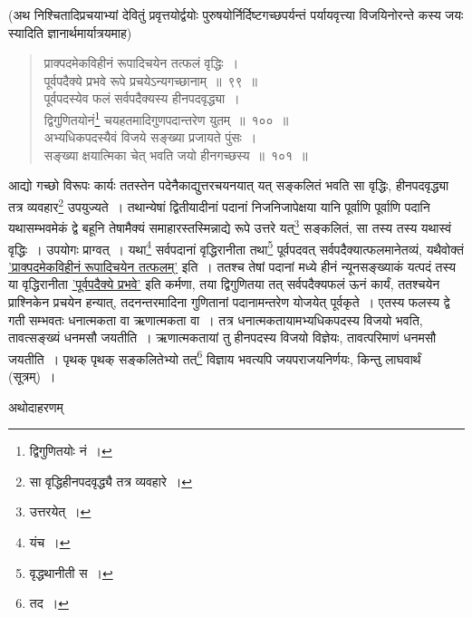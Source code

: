 \documentclass[10pt, openany]{book}
\begin{document}
{{{{{{{{{{{{{{\newpage

{(अथ निश्चितादिप्रचयाभ्यां देवितुं प्रवृत्तयोर्द्वयोः
पुरुषयोर्निर्दिष्टगच्छपर्यन्तं पर्यायवृत्त्या विजयिनोरन्ते कस्य जयः स्यादिति ज्ञानार्थमार्यात्रयमाह\textemdash)}

 \label{99}
\begin{quote}
    
{\bs प्राक्पदमेकविहीनं रूपादिचयेन तत्फलं वृद्धिः~।\\
 पूर्वपदैक्ये प्रभवे रूपे प्रचयेऽन्यगच्छानाम्~॥~९९~॥ \\
 पूर्वपदस्येव फलं सर्वपदैक्यस्य हीनपदवृद्ध्या~।\\
 द्विगुणितयोनं\renewcommand{\thefootnote}{१}\footnote{द्विगुणितयोः नं~।}  चयहतमादिगुणपदान्तरेण युतम्~॥~१००~॥ \\
 अभ्यधिकपदस्यैवं विजये सङ्ख्या प्रजायते पुंसः~।\\
 सङ्ख्या क्षयात्मिका चेत् भवति जयो हीनगच्छस्य~॥~१०१~॥}\end{quote}

{आद्यो गच्छो विरूपः कार्यः ततस्तेन पदेनैकाद्युत्तरचयनयात् यत् सङ्कलितं
भवति सा वृद्धिः,}
{हीनपदवृद्ध्या तत्र व्यवहार\renewcommand{\thefootnote}{२}\footnote{सा वृद्धिहीनपदवृद्ध्यै तत्र व्यवहारे~।}   उपयुज्यते~। तथान्येषां द्वितीयादीनां
पदानां निजनिजापेक्षया}
{यानि पूर्वाणि पूर्वाणि पदानि यथासम्भवमेकं द्वे बहूनि तेषामैक्यं
समाहारस्तस्मिन्नाद्ये रूपे}
{उत्तरे यत्\renewcommand{\thefootnote}{३}\footnote{उत्तरयेत्~।}   सङ्कलितं, सा तस्य तस्य यथास्वं वृद्धिः~। उपयोगः
प्राग्वत्~। यथा\renewcommand{\thefootnote}{४}\footnote{यंच~।}   सर्वपदानां}
{वृद्धिरानीता तथा\renewcommand{\thefootnote}{५}\footnote{वृद्धथानीती स~।} पूर्वपदवत् सर्वपदैक्यात्फलमानेतव्यं, यथैवोक्तं
\hyperref[99]{'प्राक्पदमेकविहीनं रूपादिचयेन तत्फलम्'} इति~। ततश्च तेषां पदानां मध्ये हीनं न्यूनसङ्ख्याकं यत्पदं
तस्य या वृद्धिरानीता}
{\hyperref[99]{'पूर्वपदैक्ये प्रभवे'} इति कर्मणा, तया द्विगुणितया तत् सर्वपदैक्यफलं ऊनं
कार्यं, ततश्चयेन}
{प्राश्निकेन प्रचयेन हन्यात्, तदनन्तरमादिना गुणितानां पदानामन्तरेण
योजयेत् पूर्वकृते~।}
{एतस्य फलस्य द्वे गती सम्भवतः धनात्मकता वा ऋणात्मकता वा~। तत्र
धनात्मकतायामभ्यधिकपदस्य विजयो भवति, तावत्सङ्ख्यं धनमसौ जयतीति~। ऋणात्मकतायां तु
हीनपदस्य}
{विजयो विज्ञेयः, तावत्परिमाणं धनमसौ जयतीति~। पृथक् पृथक् सङ्कलितेभ्यो
तत्\renewcommand{\thefootnote}{६}\footnote{तद~।}   विज्ञाय}
{भवत्यपि जयपराजयनिर्णयः, किन्तु लाघवार्थं (सूत्रम्)~।}
\vspace{3mm}

{अथोदाहरणम्\textendash}

\begin{quote}
    

\end{quote}}}}}}}}}}}}}}}
\end{document}
